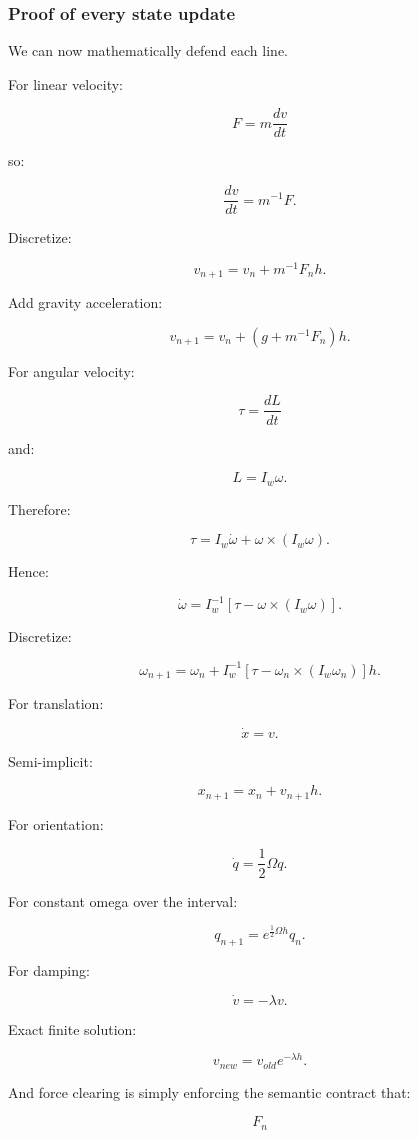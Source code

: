\subsubsection{Proof of every state update}\label{proof-of-every-state-update}

We can now mathematically defend each line.

For linear velocity:

\[
F=m\frac{dv}{dt}
\]

so:

\[
\frac{dv}{dt}=m^{-1}F.
\]

Discretize:

\[
\boxed{
v_{n+1}
=
v_n+
m^{-1}F_nh.
}
\]

Add gravity acceleration:

\[
\boxed{
v_{n+1}
=
v_n+
(g+m^{-1}F_n)h.
}
\]

For angular velocity:

\[
\tau
=
\frac{dL}{dt}
\]

and:

\[
L=I_w\omega.
\]

Therefore:

\[
\tau
=
I_w\dot\omega+
\omega\times(I_w\omega).
\]

Hence:

\[
\boxed{
\dot\omega
=
I_w^{-1}
[
\tau-
\omega\times(I_w\omega)
].
}
\]

Discretize:

\[
\boxed{
\omega_{n+1}
=
\omega_n+
I_w^{-1}
[
\tau-
\omega_n\times(I_w\omega_n)
]h.
}
\]

For translation:

\[
\dot x=v.
\]

Semi-implicit:

\[
\boxed{
x_{n+1}
=
x_n+
v_{n+1}h.
}
\]

For orientation:

\[
\dot q
=
\frac12\Omega q.
\]

For constant omega over the interval:

\[
\boxed{
q_{n+1}
=
e^{\frac12\Omega h}
q_n.
}
\]

For damping:

\[
\dot v=-\lambda v.
\]

Exact finite solution:

\[
\boxed{
v_{new}
=
v_{old}e^{-\lambda h}.
}
\]

And force clearing is simply enforcing the semantic contract that:

\[
F_n
\]

